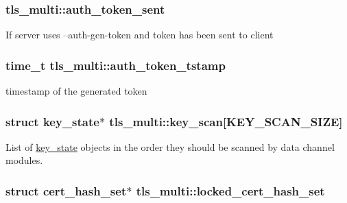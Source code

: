 \subsubsection[{auth\+\_\+token\+\_\+sent}]{ tls\+\_\+multi\+::auth\+\_\+token\+\_\+sent}\label{structtls__multi_a3a0e4ef1be4d294a440d01ae178546f8}
If server uses --auth-\/gen-\/token and token has been sent to client \hypertarget{structtls__multi_a499dd009f7a000b432f0362b48c89b55}{}
\subsubsection[{auth\+\_\+token\+\_\+tstamp}]{\setlength{\rightskip}{0pt plus 5cm}time\+\_\+t tls\+\_\+multi\+::auth\+\_\+token\+\_\+tstamp}\label{structtls__multi_a499dd009f7a000b432f0362b48c89b55}
timestamp of the generated token \hypertarget{structtls__multi_a27b151b0cdf8d80dbd920478b87fe64b}{}
\subsubsection[{key\+\_\+scan}]{\setlength{\rightskip}{0pt plus 5cm}struct {\bf key\+\_\+state}$\ast$ tls\+\_\+multi\+::key\+\_\+scan\mbox{[}{\bf K\+E\+Y\+\_\+\+S\+C\+A\+N\+\_\+\+S\+I\+Z\+E}\mbox{]}}\label{structtls__multi_a27b151b0cdf8d80dbd920478b87fe64b}
List of {\ttfamily \hyperlink{structkey__state}{key\+\_\+state}} objects in the order they should be scanned by data channel modules. \hypertarget{structtls__multi_a85b861eacbb27a9f9a9a008dec4fc55a}{}
\subsubsection[{locked\+\_\+cert\+\_\+hash\+\_\+set}]{\setlength{\rightskip}{0pt plus 5cm}struct {\bf cert\+\_\+hash\+\_\+set}$\ast$ tls\+\_\+multi\+::locked\+\_\+cert\+\_\+hash\+\_\+set}\label{structtls__multi_a85b861eacbb27a9f9a9a008dec4fc55a}
\hypertarget{structtls__multi_a922fe40b847bf8747e99f8b2af5e295d}{}
